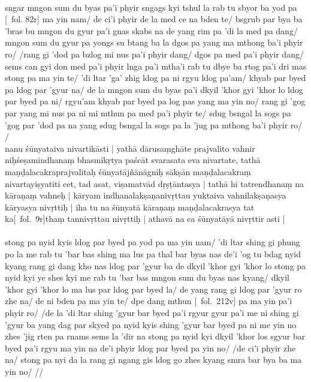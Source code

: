 \documentclass[12pt]{article}
\begin{document}
\textbf{\TVB}\\
sngar mngon sum du byas pa'i phyir sngags kyi tshul la rab tu sbyor ba yod pa [\TVB\ fol. 82r] ma yin nam/ de ci'i phyir de la med ce na bden te/ bsgrub par bya ba 'bras bu mngon du gyur pa'i gnas skabs na de yang rim pa 'di la med pa dang/ mngon sum du gyur pa yongs su btang ba la dgos pa yang ma mthong ba'i phyir ro/ /rang gi 'dod pa bzlog mi nus pa'i phyir dang/ dgos pa med pa'i phyir dang/ sems can gyi don med pa'i phyir lnga pa'i mtha'i rab tu dbye ba rtog pa'i dri mas stong pa ma yin te/ 'di ltar 'ga' zhig ldog pa ni rgyu ldog pa'am/ khyab par byed pa ldog par 'gyur na/ de la mngon sum du byas pa'i dkyil 'khor gyi 'khor lo ldog par byed pa ni/ rgyu'am khyab par byed pa log pas yang ma yin no/ rang gi 'gog par yang mi nus pa ni mi mthun pa med pa'i phyir te/ sdug bsngal la sogs pa 'gog par 'dod pa na yang sdug bsngal la sogs pa la 'jug pa mthong ba'i phyir ro/ /\\

nanu śūnyataiva nivartikāsti | yathā dārusaṃghāte prajvalito vahnir niḥśeṣamindhanaṃ bhasmīkṛtya paścāt svarasata eva nivartate, tathā maṇḍalacakraprajvalitaḥ śūnyatājñānāgniḥ sākṣān maṇḍalacakraṃ nivartayiṣyatīti cet, tad asat, viṣamatvād dṛṣṭāntasya | tathā hi tatrendhanaṃ na kāraṇaṃ vahneḥ | kāryam indhanalakṣaṇanivṛttau yuktaiva vahnilakṣaṇasya kāryasya nivṛttiḥ | iha tu na śūnyatā kāraṇaṃ maṇḍalacakrasya tat ka[\MS\ fol.\ 9r]thaṃ tannivṛttau nivṛttiḥ | athavā na ca śūnyatāyā nivṛttir asti |\\

\textbf{\TVA}\\
stong pa nyid kyis ldog par byed pa yod pa ma yin nam/ 'di ltar shing gi phung po la me rab tu 'bar bas shing ma lus pa thal bar byas nas de'i 'og tu bdag nyid kyang rang gi dang kho nas ldog par 'gyur ba de dkyil 'khor gyi 'khor lo stong pa nyid kyi ye shes kyi me rab tu 'bar bas mngon sum du byas nas kyang/ dkyil 'khor gyi 'khor lo ma lus par ldog par byed la/ de yang rang gi ldog par 'gyur ro zhe na/ de ni bden pa ma yin te/ dpe dang mthun [\TVA\ fol.\ 212v] pa ma yin pa'i phyir ro/ /de la 'di ltar shing 'gyur bar byed pa'i rgyur gyur pa'i me ni shing gi 'gyur ba yang dag par skyed pa nyid kyis shing 'gyur bar byed pa ni me yin no zhes 'jig rten pa rnams sems la 'dir na stong pa nyid kyi dkyil 'khor los sgyur bar byed pa'i rgyu ma yin na de'i phyir ldog par byed pa yin no/ /de ci'i phyir zhe na/ stong pa nyi da la rang gi ngang gis ldog go zhes kyang smra bar bya ba ma yin no/ //\\
\end{document}
